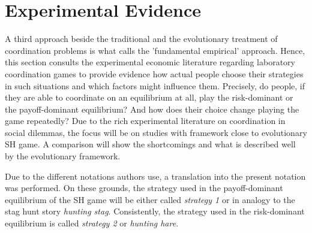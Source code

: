 \documentclass[11pt]{article}
\begin{document}
\section{Experimental Evidence}
\label{sec:experimentalevidence}
A third approach beside the traditional and the evolutionary treatment of 
coordination problems is what \textcite{camerer_behavioral_2003} calls the 
'fundamental empirical' approach.
Hence, this section consults the experimental economic literature regarding 
laboratory coordination games to provide evidence how actual people choose
their strategies in such situations and which factors might influence them. 
Precisely, do people, if they are able to coordinate on an equilibrium at all,
play the risk-dominant or the payoff-dominant equilibrium? And how does their
choice change playing the game repeatedly?
Due to the rich experimental literature on coordination in social 
dilemmas, the focus will be on studies with framework close to  
evolutionary SH game. A comparison will show the shortcomings and what
is described well by the evolutionary framework.
 
Due to the different notations authors use, a translation into the present
notation was performed.
On these grounds, the 
strategy used in the payoff-dominant equilibrium of the SH game will be 
either called  \textit{strategy 1} or in analogy to the stag hunt story 
\textit{hunting stag}.
Consistently, the strategy used in the risk-dominant equilibrium is called
\textit{strategy 2} or \textit{hunting hare}. 
\end{document}
